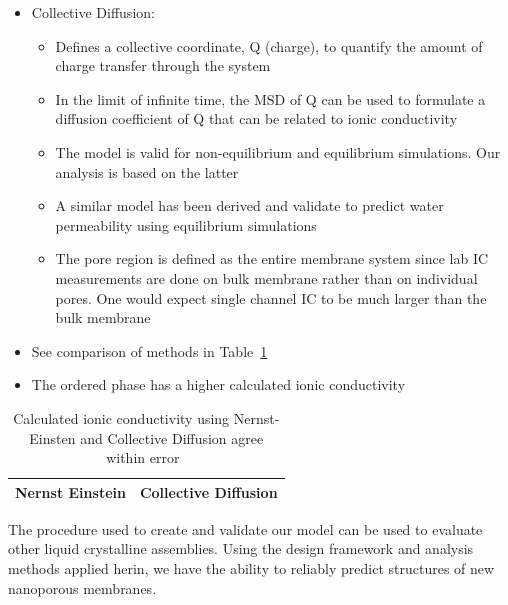 \documentclass{article}
\begin{document}
\begin{itemize}
\begin{itemize}
		\end{itemize}
		\item Collective Diffusion:  %
		\begin{itemize}
			\item Defines a collective coordinate, Q (charge), to quantify the amount of charge transfer through the system
			\item In the limit of infinite time, the MSD of Q can be used to formulate a diffusion coefficient of Q that can be related to ionic conductivity
			\item The model is valid for non-equilibrium and equilibrium simulations. Our analysis is based on the latter
			\item A similar model has been derived and validate to predict water permeability using equilibrium simulations
			\item The pore region is defined as the entire membrane system since lab IC measurements are done on bulk membrane rather than on individual pores. One would expect single channel IC to be much larger than the bulk membrane
		\end{itemize}                    
		\item See comparison of methods in Table~\ref{table:conductivity}
		\item The ordered phase has a higher calculated ionic conductivity
	\end{itemize}
	
	\begin{table}
	\centering
	\begin{tabular}{|c|c|}
	\hline
	Nernst Einstein & Collective Diffusion \\
	\hline
	\end{tabular}
	\caption{Calculated ionic conductivity using Nernst-Einsten and Collective Diffusion agree within error~\label{table:conductivity}}
	\end{table}

	The procedure used to create and validate our model can be used to evaluate other liquid crystalline assemblies. Using the design framework and analysis methods applied herin, we have the ability to reliably predict structures of new nanoporous membranes.

\end{document}
